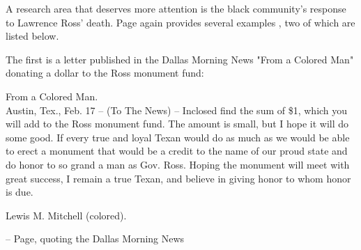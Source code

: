\documentclass[12pt]{article}
\begin{document}
A research area that deserves more attention is the black community's response to Lawrence Ross' death. Page again provides several examples \cite{page}, two of which are listed below. 

The first is a letter published in the Dallas Morning News "From a Colored Man" donating a dollar to the Ross monument fund:
\begin{displayquote}
From a Colored Man. \\
Austin, Tex., Feb. 17 – (To The News) – Inclosed find the sum of \$1, which you will add to the Ross monument fund.  The amount is small, but I hope it will do some good.  If every true and loyal Texan would do as much as we would be able to erect a monument that would be a credit to the name of our proud state and do honor to so grand a man as Gov. Ross.  Hoping the monument will meet with great success, I remain a true Texan, and believe in giving honor to whom honor is due.
  
Lewis M. Mitchell (colored).

-- Page, quoting the Dallas Morning News \cite{page}
\end{displayquote}
\end{document}
